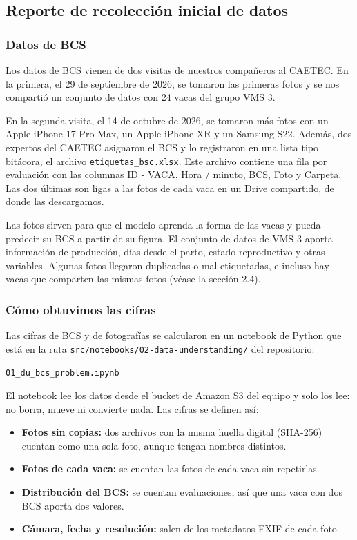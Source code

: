 \subsection{Reporte de recolección inicial de datos}

\subsubsection*{Datos de BCS}

Los datos de BCS vienen de dos visitas de nuestros compañeros al CAETEC. En la primera, el 29 de septiembre de 2026, se tomaron las primeras fotos y se nos compartió un conjunto de datos con 24 vacas del grupo VMS 3.

En la segunda visita, el 14 de octubre de 2026, se tomaron más fotos con un Apple iPhone 17 Pro Max, un Apple iPhone XR y un Samsung S22. Además, dos expertos del CAETEC asignaron el BCS y lo registraron en una lista tipo bitácora, el archivo \texttt{etiquetas\_bsc.xlsx}. Este archivo contiene una fila por evaluación con las columnas ID - VACA, Hora / minuto, BCS, Foto y Carpeta. Las dos últimas son ligas a las fotos de cada vaca en un Drive compartido, de donde las descargamos.

Las fotos sirven para que el modelo aprenda la forma de las vacas y pueda predecir su BCS a partir de su figura. El conjunto de datos de VMS 3 aporta información de producción, días desde el parto, estado reproductivo y otras variables. Algunas fotos llegaron duplicadas o mal etiquetadas, e incluso hay vacas que comparten las mismas fotos (véase la sección 2.4).

\subsubsection*{Cómo obtuvimos las cifras}

Las cifras de BCS y de fotografías se calcularon en un notebook de Python que está en la ruta \nolinkurl{src/notebooks/02-data-understanding/} del repositorio:

\begin{center}
  \nolinkurl{01_du_bcs_problem.ipynb}
\end{center}

El notebook lee los datos desde el bucket de Amazon S3 del equipo y solo los lee: no borra, mueve ni convierte nada. Las cifras se definen así:

\begin{itemize}
  \item \textbf{Fotos sin copias:} dos archivos con la misma huella digital (SHA-256) cuentan como una sola foto, aunque tengan nombres distintos.
  \item \textbf{Fotos de cada vaca:} se cuentan las fotos de cada vaca sin repetirlas.
  \item \textbf{Distribución del BCS:} se cuentan evaluaciones, así que una vaca con dos BCS aporta dos valores.
  \item \textbf{Cámara, fecha y resolución:} salen de los metadatos EXIF de cada foto.
\end{itemize}

